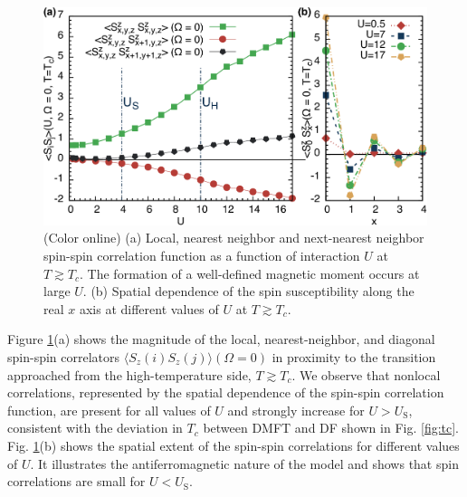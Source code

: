 \documentclass[aps,prb,twocolumn,amsmath,notitlepage,floatfix,footinbib,superscriptaddress,showpacs, showkeys]{revtex4-1}
\begin{document}
\begin{figure}[ht]
\begin{center}
\includegraphics[width=\columnwidth]{fig3.pdf}\end{center}\vspace*{-1.5em}
\caption{(Color online) (a) Local, nearest neighbor and next-nearest neighbor spin-spin correlation function as a function of interaction $U$ at $T \gtrsim T_c$. The formation of a well-defined magnetic moment occurs at large $U$. (b) Spatial dependence of the spin susceptibility along the real $x$ axis at different values of $U$ at $T \gtrsim  T_c$. }
\label{fig:sz_sz}
\end{figure}

Figure \ref{fig:sz_sz}(a) shows the magnitude of the local, nearest-neighbor, and diagonal spin-spin correlators $\langle S_z(i) S_z (j) \rangle (\Omega = 0)$ in  proximity to the transition approached from the high-temperature side, $T \gtrsim T_c$.
We observe that nonlocal correlations, represented by the spatial dependence of the spin-spin correlation function, are present for all values of $U$ and strongly increase for $U>U_\text{S}$, consistent with the deviation in $T_c$ between DMFT and DF shown in Fig. \ref{fig:tc}. 
Fig. \ref{fig:sz_sz}(b) shows the spatial extent of the spin-spin correlations for different values of $U$. It illustrates the antiferromagnetic nature of the model and shows that spin correlations are small for $U < U_\text{S}$.
\end{document}
